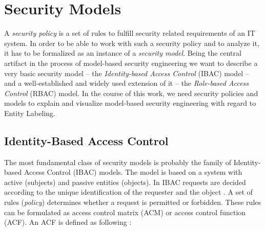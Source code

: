 \documentclass[twoside, openright, 12pt]{book}
\begin{document}
\section{Security Models}
\label{security_models}
A \textit{security policy} is a set of rules to fulfill security related requirements of an IT system.
In order to be able to work with such a security policy and to analyze it, it has to be formalized as an instance of a \textit{security model}.
Being the central artifact in the process of model-based security engineering we want to describe a very basic security model -- the \textit{Identity-based Access Control} (IBAC) model -- and a well-established and widely used extension of it -- the \textit{Role-based Access Control} (RBAC) model.
In the course of this work, we need security policies and models to explain and visualize model-based security engineering with regard to Entity Labeling.





\subsection{Identity-Based Access Control}
\label{IBAC}
The most fundamental class of security models is probably the family of Identity-based Access Control (IBAC) models.
The model is based on a system with active (subjects) and passive entities (objects).
In IBAC requests are decided according to the unique identification of the requester and the object \citep{Lampson74}.
A set of rules (\textit{policy}) determines whether a request is permitted or forbidden.
These rules can be formulated as access control matrix (ACM) or access control function (ACF).
An ACF is defined as following \citep{Amthor18}:
\end{document}
